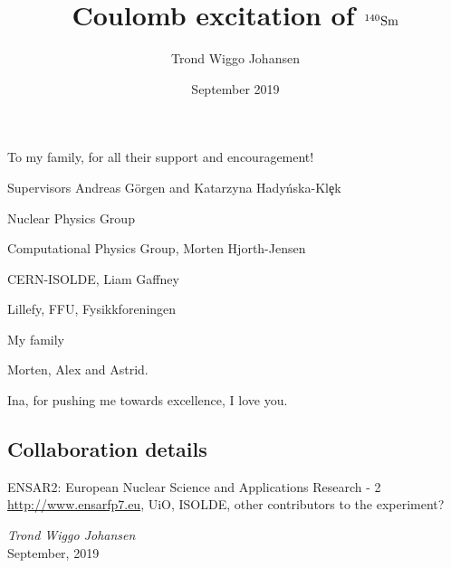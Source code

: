 \documentclass[twoside,english]{uiofysmaster/uiofysmaster}
\author{Trond Wiggo Johansen}
\title{Coulomb excitation of $\textnormal{$^{140}$Sm}$}
\date{September 2019}
\begin{document}
\setlength{\belowdisplayskip}{12pt} \setlength{\belowdisplayshortskip}{12pt}
\setlength{\abovedisplayskip}{12pt} \setlength{\abovedisplayshortskip}{12pt}

\maketitle


\begin{abstract}


\end{abstract}


\begin{dedication}
To my family, for all their support and encouragement!

\end{dedication}

\begin{acknowledgements}
Supervisors Andreas Görgen and Katarzyna Hady\'nska-Kl\c ek

Nuclear Physics Group

Computational Physics Group, Morten Hjorth-Jensen

CERN-ISOLDE, Liam Gaffney

Lillefy, FFU, Fysikkforeningen

My family

Morten, Alex and Astrid.

Ina, for pushing me towards excellence, I love you.

\subsection*{Collaboration details}



ENSAR2: European Nuclear Science and Applications Research - 2 \url{http://www.ensarfp7.eu}, UiO, ISOLDE, other contributors to the experiment?

  \vspace{1.5cm}
  
  \noindent\textit{Trond Wiggo Johansen}\\
  
  \noindent September, 2019
  
\end{acknowledgements}


\tableofcontents
\end{document}
